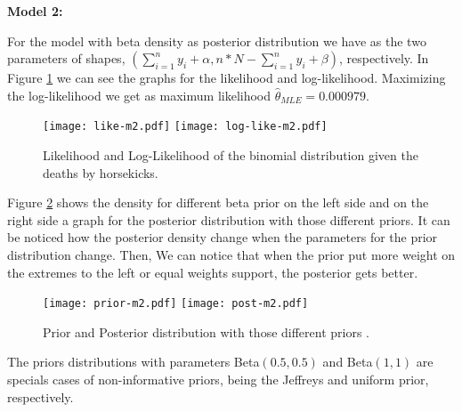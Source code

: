 \documentclass[a4paper, 11pt]{article}
\begin{document}
\noindent
\textbf{Model 2:}

For the model with beta density as posterior distribution we have as the two parameters of shapes, $(\sum_{i=1}^{n}y_i + \alpha,n*N - \sum_{i=1}^{n}y_i + \beta)$, respectively.
In Figure \ref{FigLik2} we can see the graphs for the likelihood and log-likelihood. Maximizing the log-likelihood we get as maximum likelihood $\hat{\theta}_{MLE} = 0.000979$.

\begin{figure}[H]
\centering

\texttt{[image: like-m2.pdf]} \texttt{[image: log-like-m2.pdf]} 
\caption{Likelihood and Log-Likelihood of the binomial distribution given the deaths by horsekicks.}
\label{FigLik2}
\end{figure}

Figure \ref{Fig22} shows the density for different beta prior on the left side and on the right side a graph for the posterior distribution with those different priors. It can be noticed how the posterior density change when the parameters for the prior distribution change. Then, We can notice that when the prior put more weight on the extremes to the left or equal weights support, the posterior gets better.

\begin{figure}[H]
\centering
\texttt{[image: prior-m2.pdf]}
\texttt{[image: post-m2.pdf]}
\caption{Prior and Posterior distribution with those different priors .}
\label{Fig22}
\end{figure}


The priors distributions with parameters Beta$(0.5,0.5)$ and Beta$(1,1)$ are specials cases of non-informative priors, being the Jeffreys and uniform prior, respectively.
\end{document}
